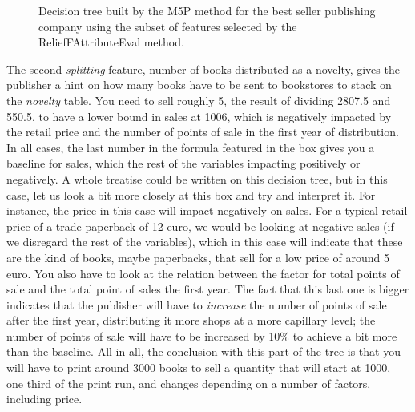 \documentclass[a4paper,10pt,twocolumn,preprint,3p]{elsarticle}
\begin{document}
\begin{figure}[!ht] 
\begin{center}
\caption{Decision tree built by the M5P method for the best seller
  publishing company using the subset of features selected by the
  {\sf ReliefFAttributeEval} method.} 
\label{fig:decision_tree_best_seller_fs}
\end{center}
\end{figure}

The second {\em splitting} feature, number of books distributed as a
novelty, gives the publisher a hint on how many books have to be sent
to bookstores to stack on the {\em novelty} table. You need to sell
roughly 5, the result of dividing 2807.5 and 550.5, to have a lower
bound in sales at 1006, which is negatively impacted by the retail
price and the number of points of sale in the first year of
distribution. In all cases, the last number in the formula featured in
the box gives you a baseline for sales, which the rest of the
variables impacting positively or negatively. A whole treatise could
be written on this decision tree, but in this case, let us look a bit
more closely at this box and try and interpret it. For instance, the price
in this case will impact negatively on sales. For a typical retail
price of a trade paperback of 12 euro, we would be looking at negative
sales (if we disregard the rest of the variables), which in this case
will indicate that these are the kind of books, maybe paperbacks, that
sell for a low price of around 5 euro. You also have to look at the
relation between the factor for total points of sale and the total
point of sales the first year. The fact that this last one is bigger
indicates that the publisher will have to {\em increase} the number of
points of sale after the first year, distributing it more shops at a
more capillary level; the number of points of sale will have to be
increased by 10\% to achieve a bit more than the baseline. All in all,
the conclusion with this part of the tree is that you will have to
print around 3000 books to sell a quantity that will start at 1000,
one third of the print run, and changes depending on a number of
factors, including price.
\end{document}
